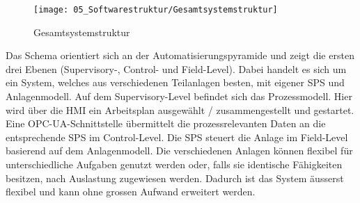 \begin{figure}[h!]
	\centering
	\texttt{[image: 05\_Softwarestruktur/Gesamtsystemstruktur]}
	\captionsetup{justification=centering}
	\caption{Gesamtsystemstruktur}
	\label{fig:Gesamtsystemstruktur}
\end{figure}

Das Schema orientiert sich an der Automatisierungspyramide \cite{Automatisierungspyramide} und zeigt die ersten drei Ebenen (Supervisory-, Control- und Field-Level). Dabei handelt es sich um ein System, welches aus verschiedenen Teilanlagen besten, mit eigener \Gls{SPS} und Anlagenmodell. Auf dem Supervisory-Level befindet sich das Prozessmodell. Hier wird über die HMI ein Arbeitsplan ausgewählt / zusammengestellt und gestartet. Eine OPC-UA-Schnittstelle übermittelt die prozessrelevanten Daten an die entsprechende \Gls{SPS} im Control-Level. Die \Gls{SPS} steuert die Anlage im Field-Level basierend auf dem Anlagenmodell. Die verschiedenen Anlagen können flexibel für unterschiedliche Aufgaben genutzt werden oder, falls sie identische Fähigkeiten besitzen, nach Auslastung zugewiesen werden. Dadurch ist das System äusserst flexibel und kann ohne grossen Aufwand erweitert werden.
